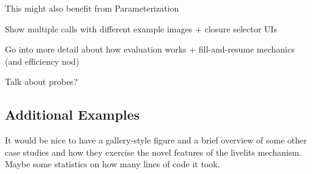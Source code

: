This might also benefit from Parameterization

Show multiple calls with different example images + closure selector UIs

Go into more detail about how evaluation works + fill-and-resume mechanics (and efficiency nod)

Talk about probes?

\subsection{Additional Examples}\label{sec:additional-examples}
It would be nice to have a gallery-style figure and a brief overview of some other case studies
and how they exercise the novel features of the livelits mechanism. Maybe some statistics on how
many lines of code it took.

